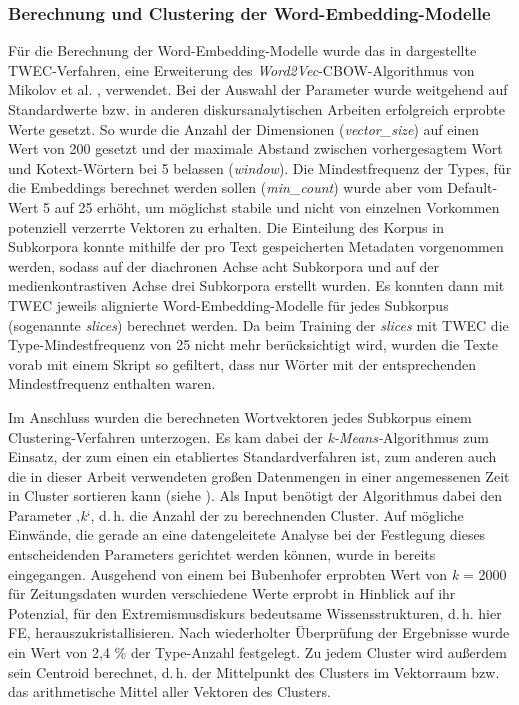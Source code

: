 \subsubsection{Berechnung und Clustering der Word-Embedding-Modelle}\label{berechnung-und-clustering-der-word-embedding-modelle}

Für die Berechnung der Word-Embedding-Modelle wurde das in  dargestellte TWEC-Verfahren, eine Erweiterung des \emph{Word2Vec}-CBOW-Algorith\-mus von Mikolov et al. \autocite*{mikolovEfficientEstimationWord2013}, verwendet. Bei der Auswahl der Parameter wurde weitgehend auf Standardwerte bzw. in anderen diskursanalytischen Arbeiten erfolgreich erprobte Werte gesetzt. So wurde die Anzahl der Dimensionen (\emph{vector\_size}) auf einen Wert von 200 gesetzt und der maximale Abstand zwischen vorhergesagtem Wort und Kotext-Wörtern bei 5 belassen (\emph{window}). Die Mindestfrequenz der Types, für die Embeddings berechnet werden sollen (\emph{min\_count}) wurde aber vom Default-Wert 5 auf 25 erhöht, um möglichst stabile und nicht von einzelnen Vorkommen potenziell verzerrte Vektoren zu erhalten. Die Einteilung des Korpus in Subkorpora konnte mithilfe der pro Text gespeicherten Metadaten vorgenommen werden, sodass auf der diachronen Achse acht Subkorpora und auf der medienkontrastiven Achse drei Subkorpora erstellt wurden. Es konnten dann mit TWEC jeweils alignierte Word-Embedding-Modelle für jedes Subkorpus (sogenannte \emph{slices}) berechnet werden. Da beim Training der \emph{slices} mit TWEC die Type-Mindestfrequenz von 25 nicht mehr berücksichtigt wird, wurden die Texte vorab mit einem Skript so gefiltert, dass nur Wörter mit der entsprechenden Mindestfrequenz enthalten waren.

Im Anschluss wurden die berechneten Wortvektoren jedes Subkorpus einem Clustering-Verfahren unterzogen. Es kam dabei der \emph{k-Means-}Algorithmus zum Einsatz, der zum einen ein etabliertes Standardverfahren ist, zum anderen auch die in dieser Arbeit verwendeten großen Datenmengen in einer angemessenen Zeit in Cluster sortieren kann (siehe ). Als Input benötigt der Algorithmus dabei den Parameter ‚\emph{k}`, d.\,h. die Anzahl der zu berechnenden Cluster. Auf mögliche Einwände, die gerade an eine datengeleitete Analyse bei der Festlegung dieses entscheidenden Parameters gerichtet werden können, wurde in  bereits eingegangen. Ausgehend von einem bei Bubenhofer \autocite*{bubenhoferSemantischeAquivalenzGeburtserzahlungen2020} erprobten Wert von \emph{k} = 2000 für Zeitungsdaten wurden verschiedene Werte erprobt in Hinblick auf ihr Potenzial, für den Extremismusdiskurs bedeutsame Wissensstrukturen, d.\,h. hier FE, herauszukristallisieren. Nach wiederholter Überprüfung der Ergebnisse wurde ein Wert von 2,4 \% der Type-Anzahl festgelegt. Zu jedem Cluster wird außerdem sein Centroid berechnet, d.\,h. der Mittelpunkt des Clusters im Vektorraum bzw. das arithmetische Mittel aller Vektoren des Clusters.

